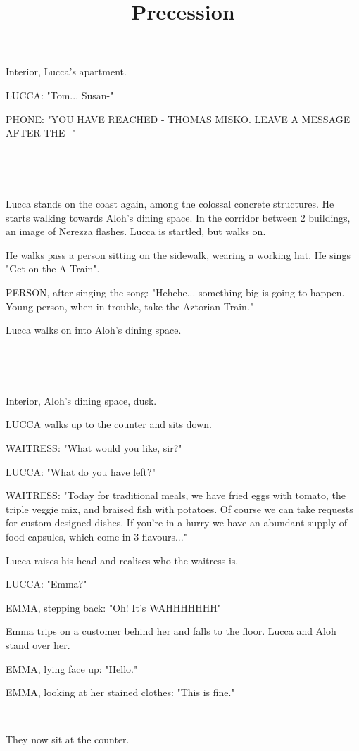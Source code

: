 \documentclass[11pt]{article}
\begin{document}
\ttfamily
\title{Precession}
\maketitle

Interior, Lucca's apartment.

LUCCA: "Tom... Susan-"

PHONE: "YOU HAVE REACHED - THOMAS MISKO.
LEAVE A MESSAGE AFTER THE -"

\ 

\ 

Lucca stands on the coast again, among the colossal concrete structures.
He starts walking towards Aloh's dining space.
In the corridor between 2 buildings, an image of Nerezza flashes.
Lucca is startled, but walks on.

He walks pass a person sitting on the sidewalk, wearing a working hat.
He sings "Get on the A Train".

PERSON, after singing the song: "Hehehe... something big is going to happen.
Young person, when in trouble, take the Aztorian Train."

Lucca walks on into Aloh's dining space. 

\ 

\ 

Interior, Aloh's dining space, dusk. 

LUCCA walks up to the counter and sits down.

WAITRESS: "What would you like, sir?"

LUCCA: "What do you have left?"

WAITRESS: "Today for traditional meals, we have fried eggs with tomato, the triple veggie mix, and braised fish with potatoes.
Of course we can take requests for custom designed dishes.
If you're in a hurry we have an abundant supply of food capsules, which come in 3 flavours..."

Lucca raises his head and realises who the waitress is.

LUCCA: "Emma?"

EMMA, stepping back: "Oh! It's WAHHHHHHH"

Emma trips on a customer behind her and falls to the floor.
Lucca and Aloh stand over her.

EMMA, lying face up: "Hello."

EMMA, looking at her stained clothes: "This is fine."

\ 

They now sit at the counter.
\end{document}
